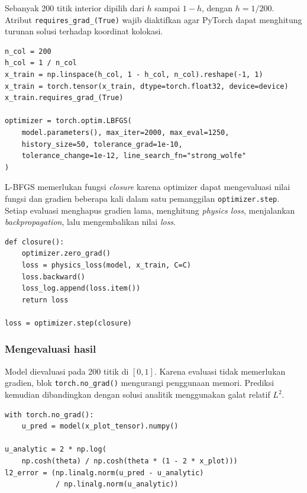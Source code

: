 \documentclass[12pt, letterpaper]{article}
\begin{document}
Sebanyak 200 titik interior dipilih dari $h$ sampai $1-h$, dengan
$h=1/200$. Atribut \texttt{requires\_grad\_(True)} wajib diaktifkan agar
PyTorch dapat menghitung turunan solusi terhadap koordinat kolokasi.

\begin{lstlisting}[caption={Titik kolokasi dan optimizer L-BFGS untuk Bratu}]
n_col = 200
h_col = 1 / n_col
x_train = np.linspace(h_col, 1 - h_col, n_col).reshape(-1, 1)
x_train = torch.tensor(x_train, dtype=torch.float32, device=device)
x_train.requires_grad_(True)

optimizer = torch.optim.LBFGS(
    model.parameters(), max_iter=2000, max_eval=1250,
    history_size=50, tolerance_grad=1e-10,
    tolerance_change=1e-12, line_search_fn="strong_wolfe"
)
\end{lstlisting}

L-BFGS memerlukan fungsi \textit{closure} karena optimizer dapat mengevaluasi
nilai fungsi dan gradien beberapa kali dalam satu pemanggilan
\texttt{optimizer.step}. Setiap evaluasi menghapus gradien lama, menghitung
\textit{physics loss}, menjalankan \textit{backpropagation}, lalu mengembalikan
nilai \textit{loss}.

\begin{lstlisting}[caption={Closure pelatihan Bratu}]
def closure():
    optimizer.zero_grad()
    loss = physics_loss(model, x_train, C=C)
    loss.backward()
    loss_log.append(loss.item())
    return loss

loss = optimizer.step(closure)
\end{lstlisting}

\subsubsection{Mengevaluasi hasil}

Model dievaluasi pada 200 titik di $[0,1]$. Karena evaluasi tidak memerlukan
gradien, blok \texttt{torch.no\_grad()} mengurangi penggunaan memori. Prediksi
kemudian dibandingkan dengan solusi analitik menggunakan galat relatif $L^2$.

\begin{lstlisting}[caption={Evaluasi solusi Bratu}]
with torch.no_grad():
    u_pred = model(x_plot_tensor).numpy()

u_analytic = 2 * np.log(
    np.cosh(theta) / np.cosh(theta * (1 - 2 * x_plot)))
l2_error = (np.linalg.norm(u_pred - u_analytic)
            / np.linalg.norm(u_analytic))
\end{lstlisting}
\end{document}
